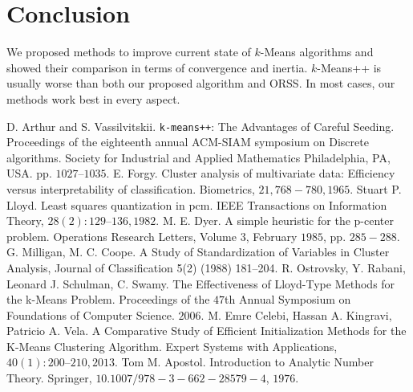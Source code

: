 \documentclass[twoside, 11pt]{article}
\begin{document}
	\section{Conclusion}
	We proposed methods to improve current state of $k$-Means algorithms and showed their comparison in terms of convergence and inertia. $k$-Means++ is usually worse than both our proposed algorithm and ORSS. In most cases, our methods work best in every aspect.
	\begin{thebibliography}{99}
		 D. Arthur and S. Vassilvitskii. \texttt{k-means++}: The Advantages of Careful Seeding. Proceedings of the eighteenth annual ACM-SIAM symposium on Discrete algorithms. Society for Industrial and Applied Mathematics Philadelphia, PA, USA. pp. $1027–1035$.
		 E. Forgy. Cluster analysis of multivariate data: Efficiency versus interpretability of classification. Biometrics, $21, 768-780, 1965$.
		 Stuart P. Lloyd. Least squares quantization in pcm. IEEE Transactions on Information Theory, $28(2):129–136, 1982$.
		 M. E. Dyer. A simple heuristic for the p-center problem. Operations Research Letters, Volume $3$, February $1985$, pp. $285-288$.
		 G. Milligan, M. C. Coope. A Study of Standardization of Variables in Cluster Analysis, Journal of Classification 5(2) (1988) 181–204.
		 R. Ostrovsky, Y. Rabani, Leonard J. Schulman, C. Swamy. The Effectiveness of Lloyd-Type Methods for the k-Means Problem. Proceedings of the $47$th Annual Symposium on Foundations of Computer Science. $2006$.
		 M. Emre Celebi, Hassan A. Kingravi, Patricio A. Vela. A Comparative Study of Efficient Initialization Methods for the K-Means Clustering Algorithm. Expert Systems with Applications, $40(1): 200–210, 2013$.
		 Tom M. Apostol. Introduction to Analytic Number Theory. Springer, $10.1007/978-3-662-28579-4$, $1976$.
	\end{thebibliography}
\end{document}
